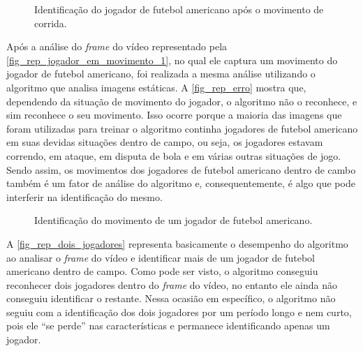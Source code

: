 
\begin{figure}[ht]
	\caption{\label{fig_rep_jogador_em_movimento_2}Identificação do jogador de futebol americano após o movimento de corrida.}
	\begin{center}
	\end{center}
	\centering {}
\end{figure}

Após a análise do \textit{frame} do vídeo representado pela \autoref{fig_rep_jogador_em_movimento_1}, no qual ele captura um movimento do jogador de futebol americano, foi realizada a mesma análise utilizando o algoritmo que analisa imagens estáticas. A \autoref{fig_rep_erro} mostra que, dependendo da situação de movimento do jogador, o algoritmo não o reconhece, e sim reconhece o seu movimento. Isso ocorre porque a maioria das imagens que foram utilizadas para treinar o algoritmo continha jogadores de futebol americano em suas devidas situações dentro de campo, ou seja, os jogadores estavam correndo, em ataque, em disputa de bola e em várias outras situações de jogo. Sendo assim, os movimentos dos jogadores de futebol americano dentro de cambo também é um fator de análise do algoritmo e, consequentemente, é algo que pode interferir na identificação do mesmo.

\begin{figure}[ht]
	\caption{\label{fig_rep_erro}Identificação do movimento de um jogador de futebol americano.}
	\begin{center}
	\end{center}
	\centering {}
\end{figure}


A \autoref{fig_rep_dois_jogadores} representa basicamente o desempenho do algoritmo ao analisar o \textit{frame} do vídeo e identificar mais de um jogador de futebol americano dentro de campo. Como pode ser visto, o algoritmo conseguiu reconhecer dois jogadores dentro do \textit{frame} do vídeo, no entanto ele ainda não conseguiu identificar o restante. Nessa ocasião em específico, o algoritmo não seguiu com a identificação dos dois jogadores por um período longo e nem curto, pois ele “se perde” nas características e permanece identificando apenas um jogador.

